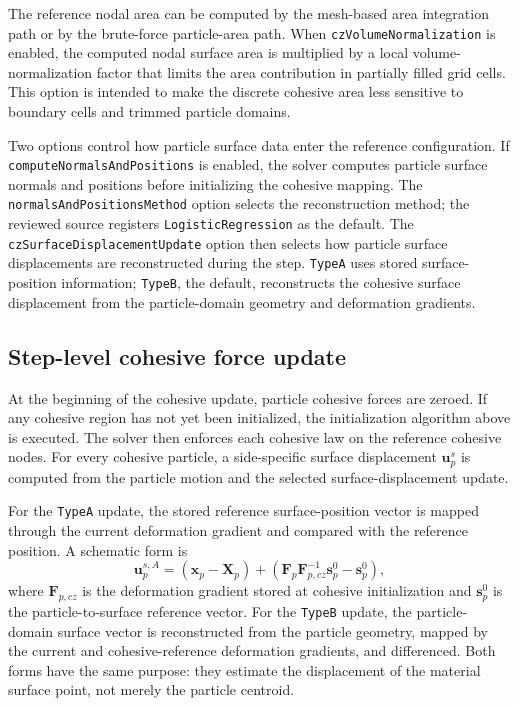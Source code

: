 The reference nodal area can be computed by the mesh-based area integration path or by the brute-force particle-area path.  When \texttt{czVolumeNormalization} is enabled, the computed nodal surface area is multiplied by a local volume-normalization factor that limits the area contribution in partially filled grid cells.  This option is intended to make the discrete cohesive area less sensitive to boundary cells and trimmed particle domains.

Two options control how particle surface data enter the reference configuration.  If \texttt{computeNormalsAndPositions} is enabled, the solver computes particle surface normals and positions before initializing the cohesive mapping.  The \texttt{normalsAndPositionsMethod} option selects the reconstruction method; the reviewed source registers \texttt{LogisticRegression} as the default.  The \texttt{czSurfaceDisplacementUpdate} option then selects how particle surface displacements are reconstructed during the step.  \texttt{TypeA} uses stored surface-position information; \texttt{TypeB}, the default, reconstructs the cohesive surface displacement from the particle-domain geometry and deformation gradients.

\subsection{Step-level cohesive force update}

At the beginning of the cohesive update, particle cohesive forces are zeroed.  If any cohesive region has not yet been initialized, the initialization algorithm above is executed.  The solver then enforces each cohesive law on the reference cohesive nodes.  For every cohesive particle, a side-specific surface displacement $\mathbf{u}^s_p$ is computed from the particle motion and the selected surface-displacement update.

For the \texttt{TypeA} update, the stored reference surface-position vector is mapped through the current deformation gradient and compared with the reference position.  A schematic form is
\begin{equation}
  \mathbf{u}^{s,A}_p
  = (\mathbf{x}_p-\mathbf{X}_p)
    + \left(\mathbf{F}_p \mathbf{F}^{-1}_{p,cz}\mathbf{s}^0_p-\mathbf{s}^0_p\right),
  \label{eq:cz-typea-displacement}
\end{equation}
where $\mathbf{F}_{p,cz}$ is the deformation gradient stored at cohesive initialization and $\mathbf{s}^0_p$ is the particle-to-surface reference vector.  For the \texttt{TypeB} update, the particle-domain surface vector is reconstructed from the particle geometry, mapped by the current and cohesive-reference deformation gradients, and differenced.  Both forms have the same purpose: they estimate the displacement of the material surface point, not merely the particle centroid.

